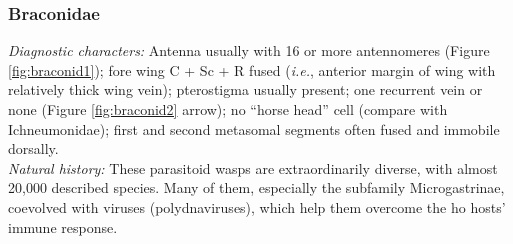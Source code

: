 \documentclass[letterpaper, 11pt]{article}
\begin{document}
\subsubsection{Braconidae}
\noindent{}\textit{Diagnostic characters:} Antenna usually with 16 or more antennomeres (Figure \ref{fig:braconid1}); fore wing C + Sc + R fused (\textit{i.e.}, anterior margin of wing with relatively thick wing vein); pterostigma usually present; one recurrent vein or none (Figure \ref{fig:braconid2} arrow); no ``horse head'' cell (compare with Ichneumonidae); first and second metasomal segments often fused and immobile dorsally.\\

\noindent{}\textit{Natural history:} These parasitoid wasps are extraordinarily diverse, with almost 20,000 described species. Many of them, especially the subfamily Microgastrinae, coevolved with viruses (polydnaviruses), which help them overcome the ho hosts' immune response.\\
\end{document}
